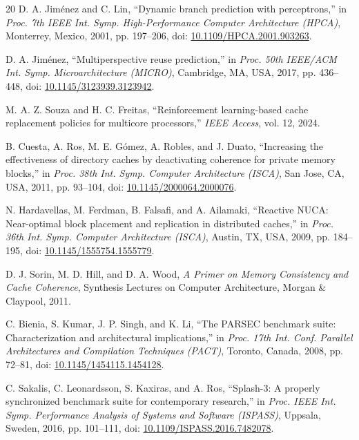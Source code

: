 \documentclass[conference]{IEEEtran}
\begin{document}
\begin{thebibliography}{20}
D. A. Jiménez and C. Lin,
``Dynamic branch prediction with perceptrons,''
in \textit{Proc. 7th IEEE Int. Symp. High-Performance Computer Architecture (HPCA)},
Monterrey, Mexico, 2001, pp. 197--206,
doi: \href{https://doi.org/10.1109/HPCA.2001.903263}{10.1109/HPCA.2001.903263}.

D. A. Jiménez,
``Multiperspective reuse prediction,''
in \textit{Proc. 50th IEEE/ACM Int. Symp. Microarchitecture (MICRO)},
Cambridge, MA, USA, 2017, pp. 436--448,
doi: \href{https://doi.org/10.1145/3123939.3123942}{10.1145/3123939.3123942}.

M. A. Z. Souza and H. C. Freitas,
``Reinforcement learning-based cache replacement policies for multicore processors,''
\textit{IEEE Access}, vol. 12, 2024.

B. Cuesta, A. Ros, M. E. Gómez, A. Robles, and J. Duato,
``Increasing the effectiveness of directory caches by deactivating coherence for private memory blocks,''
in \textit{Proc. 38th Int. Symp. Computer Architecture (ISCA)},
San Jose, CA, USA, 2011, pp. 93--104,
doi: \href{https://doi.org/10.1145/2000064.2000076}{10.1145/2000064.2000076}.

N. Hardavellas, M. Ferdman, B. Falsafi, and A. Ailamaki,
``Reactive NUCA: Near-optimal block placement and replication in distributed caches,''
in \textit{Proc. 36th Int. Symp. Computer Architecture (ISCA)},
Austin, TX, USA, 2009, pp. 184--195,
doi: \href{https://doi.org/10.1145/1555754.1555779}{10.1145/1555754.1555779}.

D. J. Sorin, M. D. Hill, and D. A. Wood,
\textit{A Primer on Memory Consistency and Cache Coherence},
Synthesis Lectures on Computer Architecture, Morgan \& Claypool, 2011.

C. Bienia, S. Kumar, J. P. Singh, and K. Li,
``The PARSEC benchmark suite: Characterization and architectural implications,''
in \textit{Proc. 17th Int. Conf. Parallel Architectures and Compilation Techniques (PACT)},
Toronto, Canada, 2008, pp. 72--81,
doi: \href{https://doi.org/10.1145/1454115.1454128}{10.1145/1454115.1454128}.

C. Sakalis, C. Leonardsson, S. Kaxiras, and A. Ros,
``Splash-3: A properly synchronized benchmark suite for contemporary research,''
in \textit{Proc. IEEE Int. Symp. Performance Analysis of Systems and Software (ISPASS)},
Uppsala, Sweden, 2016, pp. 101--111,
doi: \href{https://doi.org/10.1109/ISPASS.2016.7482078}{10.1109/ISPASS.2016.7482078}.


\end{thebibliography}
\end{document}
